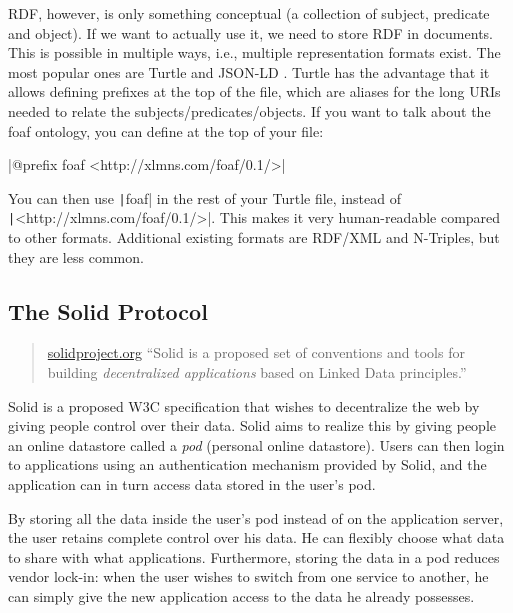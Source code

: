 \gls{RDF}, however, is only something conceptual (a collection of subject, predicate and object). If we want to actually use it, we need to store \gls{RDF} in documents. This is possible in multiple ways, i.e., multiple representation formats exist. The most popular ones are Turtle \citep{turtle} and JSON-LD \citep{jsonld}. Turtle has the advantage that it allows defining prefixes at the top of the file, which are aliases for the long URIs needed to relate the subjects/predicates/objects. If you want to talk about the foaf ontology, you can define at the top of your file:

|@prefix foaf <http://xlmns.com/foaf/0.1/>|

\noindent You can then use \texttt|foaf| in the rest of your Turtle file, instead of\\ \texttt|<http://xlmns.com/foaf/0.1/>|. This makes it very human-readable compared to other formats. Additional existing formats are \gls{RDF}/XML and N-Triples, but they are less common.

\subsection{The Solid Protocol}
\label{sec:solid-protocol}
\begin{quote}{\href{https://solidproject.org}{solidproject.org}}
    ``Solid is a proposed set of conventions and tools for building \textit{decentralized applications} based on Linked Data principles.''
\end{quote}

\noindent Solid \citep{solid} is a proposed W3C specification that wishes to decentralize the web by giving people control over their data. Solid aims to realize this by giving people an online datastore called a \textit{pod} (personal online datastore). Users can then login to applications using an authentication mechanism provided by Solid, and the application can in turn access data stored in the user's pod.

By storing all the data inside the user's pod instead of on the application server, the user retains complete control over his data. He can flexibly choose what data to share with what applications. Furthermore, storing the data in a pod reduces vendor lock-in: when the user wishes to switch from one service to another, he can simply give the new application access to the data he already possesses. 

